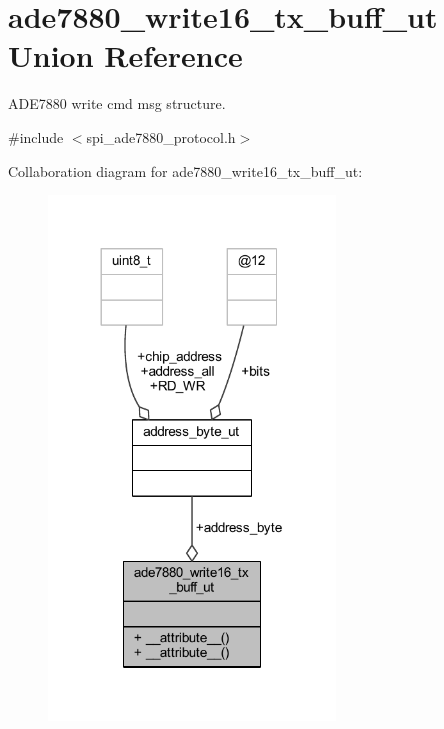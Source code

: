 \hypertarget{a00017}{\section{ade7880\-\_\-write16\-\_\-tx\-\_\-buff\-\_\-ut Union Reference}
\label{d4/d51/a00017}
}


A\-D\-E7880 write cmd msg structure.  




{\ttfamily \#include $<$spi\-\_\-ade7880\-\_\-protocol.\-h$>$}



Collaboration diagram for ade7880\-\_\-write16\-\_\-tx\-\_\-buff\-\_\-ut\-:\nopagebreak
\begin{figure}[H]
\begin{center}
\leavevmode
\includegraphics[width=216pt]{d0/d89/a00071}
\end{center}
\end{figure}
